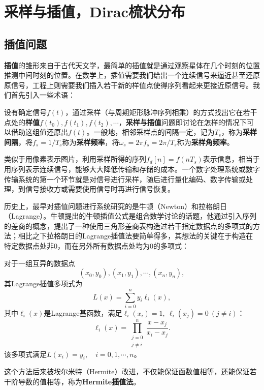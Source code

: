 \section{采样与插值，Dirac梳状分布}\label{sec:Sampling_Interpolation}

\subsection{插值问题}\label{sub:interpolation}
\textbf{插值}的雏形来自于古代天文学，最简单的插值就是通过观察星体在几个时刻的位置推测中间时刻的位置。在数学上，插值需要我们给出一个连续信号来逼近甚至还原原信号，工程上则需要我们插入若干新的样值点使得序列看起来更接近原信号。我们首先引入一些术语：
\begin{definition}
    设有确定信号$f(t)$，通过采样（与周期矩形脉冲序列相乘）的方式找出它在若干点处的\textbf{样值}$f(t_0),f(t_1),f(t_2),\cdots$，\textbf{采样与插值}问题即讨论在怎样的情况下可以借助这组值还原出$f(t)$。一般地，相邻采样点的间隔一定，记为$T_s$，称为\textbf{采样间隔}，将$f_s=1/T_s$称为\textbf{采样频率}，将$\omega_s=2\pi f_s=2\pi/T_s$称为\textbf{采样角频率}。
\end{definition}

类似于用像素表示图片，利用采样所得的序列$f_d[n]=f(nT_s)$表示信息，相当于用序列表示连续信号，能够大大降低传输和存储的成本。一个数字处理系统或数字传输系统的第一个环节就是对信号进行采样，随后进行量化编码、数字传输或处理，到信号接收方或需要使用信号时再进行信号恢复。

历史上，最早对插值问题进行系统研究的是牛顿（Newton）和拉格朗日（Lagrange）。牛顿提出的牛顿插值公式是组合数学讨论的话题，他通过引入序列的差商的概念，提出了一种使用三角形差商表构造过若干指定数据点的多项式的方法；相比之下拉格朗日的Lagrange插值法要简单得多，其想法的关键在于构造在特定数据点处非$0$，而在另外所有数据点处均为$0$的多项式：
\begin{definition}[Lagrange插值法]
    对于一组互异的数据点
    \begin{equation}
        (x_0,y_0),(x_1,y_1),\cdots,(x_n,y_n),
    \end{equation}
    其Lagrange插值多项式为
    \begin{equation}
        L(x) = \sum_{i=0}^{n} y_i \ell_i(x),
    \end{equation}
    其中$\ell_i(x)$是Lagrange基函数，满足$\ell_i(x_i)=1,\ \ell_i(x_j)=0\ (j\neq i)$：
    \begin{equation}
        \ell_i(x) = \prod_{\substack{j=0 \\ j \neq i}}^{n} \frac{x - x_j}{x_i - x_j}.
    \end{equation}
    该多项式满足$L(x_i) = y_i,\quad i=0,1,\cdots,n$。
\end{definition}
这个方法后来被埃尔米特（Hermite）改进，不仅能保证函数值相等，还能保证若干阶导数的值相等，称为\textbf{Hermite插值法}。

